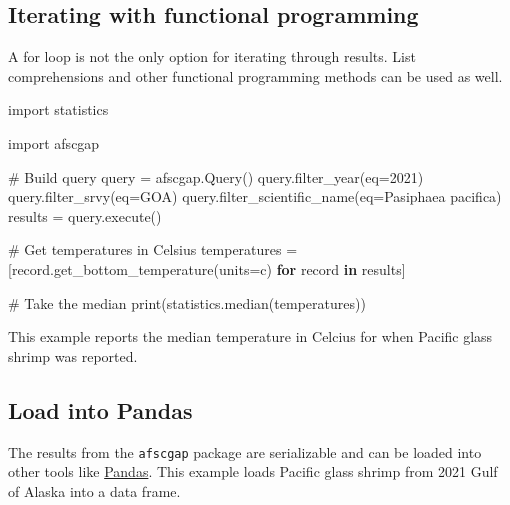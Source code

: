 \documentclass[
  letterpaper,
  oneside,
  open=any]{scrbook}
\newenvironment{Shaded}{\begin{snugshade}}{\end{snugshade}}
\newcommand{\AttributeTok}[1]{\textcolor[rgb]{0.40,0.45,0.13}{#1}}
\newcommand{\CommentTok}[1]{\textcolor[rgb]{0.37,0.37,0.37}{#1}}
\newcommand{\ControlFlowTok}[1]{\textcolor[rgb]{0.00,0.23,0.31}{\textbf{#1}}}
\newcommand{\DecValTok}[1]{\textcolor[rgb]{0.68,0.00,0.00}{#1}}
\newcommand{\FunctionTok}[1]{\textcolor[rgb]{0.28,0.35,0.67}{#1}}
\newcommand{\NormalTok}[1]{\textcolor[rgb]{0.00,0.23,0.31}{#1}}
\newcommand{\OtherTok}[1]{\textcolor[rgb]{0.00,0.23,0.31}{#1}}
\newcommand{\StringTok}[1]{\textcolor[rgb]{0.13,0.47,0.30}{#1}}
\begin{document}
\subsection{Iterating with functional
programming}\label{iterating-with-functional-programming}

A for loop is not the only option for iterating through results. List
comprehensions and other functional programming methods can be used as
well.

\begin{Shaded}
\begin{Highlighting}[]
\NormalTok{import statistics}

\NormalTok{import afscgap}

\CommentTok{\# Build query}
\NormalTok{query }\OtherTok{=} \FunctionTok{afscgap.Query}\NormalTok{()}
\FunctionTok{query.filter\_year}\NormalTok{(}\AttributeTok{eq=}\DecValTok{2021}\NormalTok{)}
\FunctionTok{query.filter\_srvy}\NormalTok{(}\AttributeTok{eq=}\StringTok{\textquotesingle{}GOA\textquotesingle{}}\NormalTok{)}
\FunctionTok{query.filter\_scientific\_name}\NormalTok{(}\AttributeTok{eq=}\StringTok{\textquotesingle{}Pasiphaea pacifica\textquotesingle{}}\NormalTok{)}
\NormalTok{results }\OtherTok{=} \FunctionTok{query.execute}\NormalTok{()}

\CommentTok{\# Get temperatures in Celsius}
\NormalTok{temperatures }\OtherTok{=}\NormalTok{ [}\FunctionTok{record.get\_bottom\_temperature}\NormalTok{(}\AttributeTok{units=}\StringTok{\textquotesingle{}c\textquotesingle{}}\NormalTok{) }\ControlFlowTok{for}\NormalTok{ record }\ControlFlowTok{in}\NormalTok{ results]}

\CommentTok{\# Take the median}
\FunctionTok{print}\NormalTok{(}\FunctionTok{statistics.median}\NormalTok{(temperatures))}
\end{Highlighting}
\end{Shaded}

This example reports the median temperature in Celcius for when Pacific
glass shrimp was reported.

\subsection{Load into Pandas}\label{load-into-pandas}

The results from the \texttt{afscgap} package are serializable and can
be loaded into other tools like
\href{https://pandas.pydata.org/}{Pandas}. This example loads Pacific
glass shrimp from 2021 Gulf of Alaska into a data frame.
\end{document}
